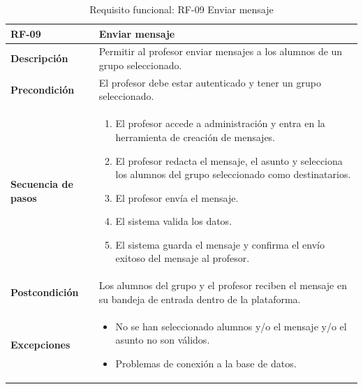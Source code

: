 \begin{table}[H]
\centering
\begin{tabularx}{\textwidth}{
  |>{\centering\arraybackslash}l
  |>{\centering\arraybackslash}X|}
\hline
\textbf{RF-09} & \textbf{Enviar mensaje} \\ \hline

\textbf{Descripción} & Permitir al profesor enviar mensajes a los alumnos de un grupo seleccionado. \\ \hline

\textbf{Precondición} & El profesor debe estar autenticado y tener un grupo seleccionado. \\ \hline

\textbf{Secuencia de pasos} & 
\begin{enumerate}
  \item El profesor accede a administración y entra en la herramienta de creación de mensajes.
  \item El profesor redacta el mensaje, el asunto y selecciona los alumnos del grupo seleccionado como destinatarios.
  \item El profesor envía el mensaje.
  \item El sistema valida los datos.
  \item El sistema guarda el mensaje y confirma el envío exitoso del mensaje al profesor.
\end{enumerate} \\ \hline

\textbf{Postcondición} & Los alumnos del grupo y el profesor reciben el mensaje en su bandeja de entrada dentro de la plataforma. \\ \hline

\textbf{Excepciones} & 
\begin{itemize}
  \item No se han seleccionado alumnos y/o el mensaje y/o el asunto no son válidos.
  \item Problemas de conexión a la base de datos.
\end{itemize} \\ \hline
\end{tabularx}
\caption{Requisito funcional: RF-09 Enviar mensaje}
\end{table}
